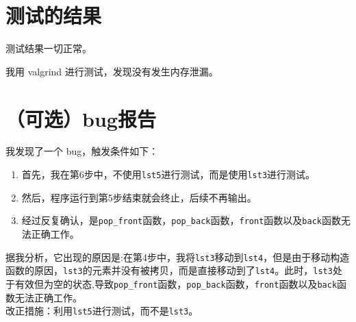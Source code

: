 \documentclass[UTF8]{ctexart}
\begin{document}
\section{测试的结果}  
 
    测试结果一切正常。  
      
    我用 valgrind 进行测试，发现没有发生内存泄漏。  
      
\section{（可选）bug报告}  
      
    我发现了一个 bug，触发条件如下：  
\begin{enumerate}  
    \item 首先，我在第6步中，不使用\texttt{lst5}进行测试，而是使用\texttt{lst3}进行测试。  
    \item 然后，程序运行到第5步结束就会终止，后续不再输出。  
    \item 经过反复确认，是\texttt{pop\_front}函数，\texttt{pop\_back}函数，\texttt{front}函数以及\texttt{back}函数无法正确工作。  
\end{enumerate}  
      
    据我分析，它出现的原因是:在第4步中，我将\texttt{lst3}移动到\texttt{lst4}，但是由于移动构造函数的原因，\texttt{lst3}的元素并没有被拷贝，而是直接移动到了\texttt{lst4}。此时，\texttt{lst3}处于有效但为空的状态,导致\texttt{pop\_front}函数，\texttt{pop\_back}函数，\texttt{front}函数以及\texttt{back}函数无法正确工作。\\
   
    改正措施：利用\texttt{lst5}进行测试，而不是\texttt{lst3}。     
\end{document}
